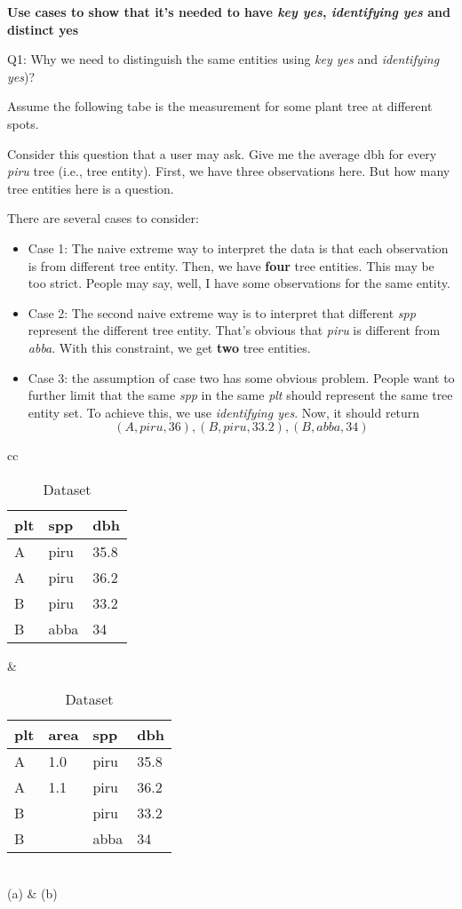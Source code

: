\documentclass[10pt]{article}
\begin{document}
{\bf Use cases to show that it's needed to have {\em key yes}, {\em identifying yes} and {distinct yes}}

Q1: Why we need to distinguish the same entities using {\em key yes} and {\em identifying yes})? 

Assume the following tabe is the measurement for some plant tree at different spots. 

Consider this question that a user may ask. Give me the average dbh for every {\em piru} tree (i.e., tree entity). 
First, we have three observations here.
But how many tree entities here is a question. 

There are several cases to consider:
\begin{itemize}
\item Case 1: The naive extreme way to interpret the data is that each observation is from different tree entity. Then, we have {\bf four} tree entities. 
	This may be too strict. People may say, well, I have some observations for the same entity. 
\item Case 2: The second naive extreme way is to interpret that different {\em spp} represent the different tree entity. 
That's obvious that {\em piru} is different from {\em abba}. 
With this constraint, we get {\bf two} tree entities. 
\item Case 3: the assumption of case two has some obvious problem. 
People want to further limit that the same {\em spp} in the same {\em plt} should represent the same tree entity set. 
To achieve this, we use {\em identifying yes}.
   Now, it should return
	\[(A, piru, 36), (B, piru, 33.2), (B, abba, 34)\]
\end{itemize}

\begin{table}[htb]
\begin{center}
\begin{tabular}{cc}
\begin{tabular}{|l|l|l|}
\hline
plt & spp & dbh\\\hline
A & piru & 35.8 \\\hline
A & piru & 36.2 \\\hline
B & piru &33.2 \\\hline
B&abba&34\\\hline
\end{tabular}
&
\begin{tabular}{|l|l|l|l|}
\hline
plt & area & spp & dbh\\\hline
A & 1.0 & piru & 35.8 \\\hline
A & 1.1 & piru & 36.2 \\\hline
B & &piru &33.2 \\\hline
B& & abba&34\\\hline
\end{tabular}\\
(a) & (b)
\end{tabular}
\end{center}
\vspace{-0.2in}
\caption{Dataset}
\end{table}
\end{document}
